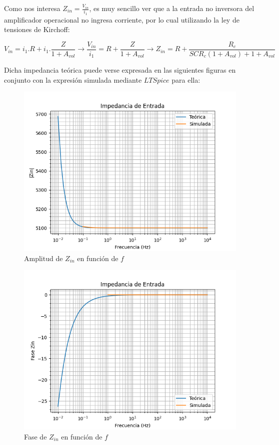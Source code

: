 Como nos interesa $Z_{in}=\frac{V_{in}}{i_1}$, es muy sencillo ver que a la entrada no inversora del amplificador operacional no ingresa corriente,
por lo cual utilizando la ley de tensiones de Kirchoff:

$$ V_{in} = i_1.R + i_1.\frac{Z}{1+A_{vol}} \longrightarrow \frac{V_{in}}{i_1}= R + \frac{Z}{1+A_{vol}} \longrightarrow Z_{in}=R+\frac{R_c}{SCR_c(1+A_{vol})+1+A_{vol}}$$

Dicha impedancia teórica puede verse expresada en las siguientes figuras en conjunto con la expresión simulada mediante $LTSpice$ para ella:

\begin{figure}[H]
    \centering 
    \includegraphics [scale=1] {../Ejercicio3-CircuitoIntegradoresyDerivadores/Imagenes/comparativo-integrador-zin-amplitud.png} 
    \caption{Amplitud de $Z_{in}$ en función de $f$}
    \label{fig:emptyPlotTool}
\end{figure}

\begin{figure}[H]
    \centering 
    \includegraphics [scale=1] {../Ejercicio3-CircuitoIntegradoresyDerivadores/Imagenes/comparativo-integrador-zin-fase.png} 
    \caption{Fase de $Z_{in}$ en función de $f$ }
    \label{fig:emptyPlotTool}
\end{figure}

